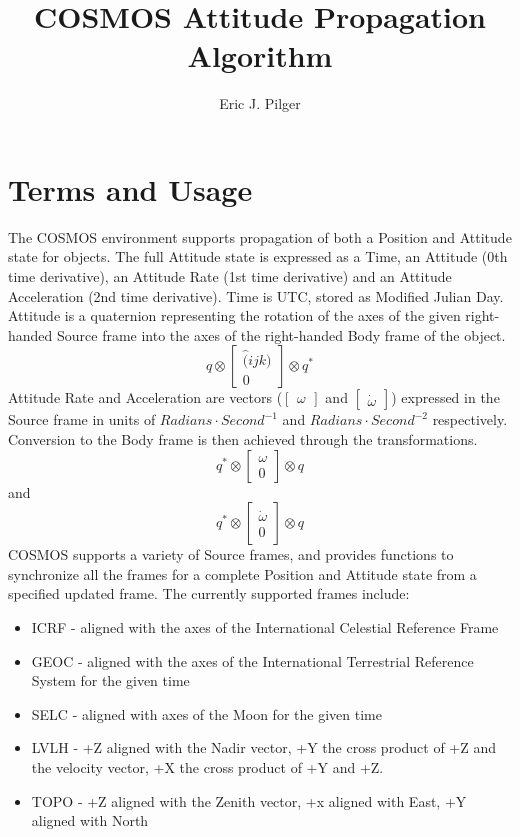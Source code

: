 \documentclass[12pt,letterpaper]{report}
\title{COSMOS Attitude Propagation Algorithm}
\author{Eric J. Pilger}
\begin{document}
\maketitle
\tableofcontents

\section{Terms and Usage}
The COSMOS environment supports propagation of both a Position and Attitude state for objects. The full Attitude state is expressed as a Time, an Attitude (0th time derivative), an Attitude Rate (1st time derivative) and an Attitude Acceleration (2nd time derivative). Time is UTC, stored as Modified Julian Day. Attitude is a quaternion representing the rotation of the axes of the given right-handed Source frame into the axes of the right-handed Body frame of the object.
\[q \otimes \begin{bmatrix} \hat(ijk)\\0 \end{bmatrix} \otimes q^{*}\]
Attitude Rate and Acceleration are vectors ($\begin{bmatrix}\omega\end{bmatrix}$ and $\begin{bmatrix}\dot{\omega}\end{bmatrix}$) expressed in the Source frame in units of $Radians \cdot Second^{-1}$ and $Radians \cdot Second^{-2}$ respectively. Conversion to the Body frame is then achieved through the transformations.
\[q^{*} \otimes \begin{bmatrix} \omega\\0 \end{bmatrix} \otimes q\] and \[q^{*} \otimes \begin{bmatrix} \dot{\omega}\\0 \end{bmatrix} \otimes q\]
COSMOS supports a variety of Source frames, and provides functions to synchronize all the frames for a complete Position and Attitude state from a specified updated frame. The currently supported frames include:
\begin{itemize}
\item ICRF - aligned with the axes of the International Celestial Reference Frame
\item GEOC - aligned with the axes of the International Terrestrial Reference System for the given time
\item SELC - aligned with axes of the Moon for the given time
\item LVLH - +Z aligned with the Nadir vector, +Y the cross product of +Z and the velocity vector, +X the cross product of +Y and +Z.
\item TOPO - +Z aligned with the Zenith vector, +x aligned with East, +Y aligned with North
\end{itemize}
\end{document}
